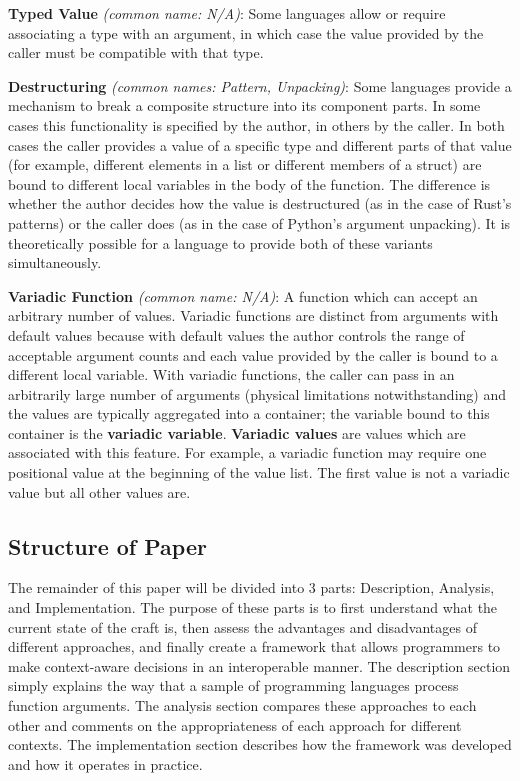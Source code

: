 \textbf{Typed Value} \textit{(common name: N/A)}:
Some languages allow or require associating a type with an argument, in which case the
value provided by the caller must be compatible with that type.

\textbf{Destructuring} \textit{(common names: Pattern, Unpacking)}:
Some languages provide a mechanism to break a composite structure into its component
parts.
In some cases this functionality is specified by the author, in others by the caller.
In both cases the caller provides a value of a specific type and different parts of that
value (for example, different elements in a list or different members of a struct) are
bound to different local variables in the body of the function.
The difference is whether the author decides how the value is destructured (as in the case
of Rust's patterns) or the caller does (as in the case of Python's argument unpacking).
It is theoretically possible for a language to provide both of these variants
simultaneously.

\textbf{Variadic Function} \textit{(common name: N/A)}:
A function which can accept an arbitrary number of values.
Variadic functions are distinct from arguments with default values because with default
values the author controls the range of acceptable argument counts and each value provided
by the caller is bound to a different local variable.
With variadic functions, the caller can pass in an arbitrarily large number of arguments
(physical limitations notwithstanding) and the values are typically aggregated into a
container; the variable bound to this container is the \textbf{variadic variable}.
\textbf{Variadic values} are values which are associated with this feature.
For example, a variadic function may require one positional value at the beginning of the
value list.
The first value is not a variadic value but all other values are.

\subsection{Structure of Paper}

The remainder of this paper will be divided into 3 parts: Description, Analysis, and
Implementation.
The purpose of these parts is to first understand what the current state of the craft is,
then assess the advantages and disadvantages of different approaches, and finally create
a framework that allows programmers to make context-aware decisions in an interoperable
manner.
The description section simply explains the way that a sample of programming languages
process function arguments.
The analysis section compares these approaches to each other and comments on the
appropriateness of each approach for different contexts.
The implementation section describes how the framework was developed and how it operates
in practice.
